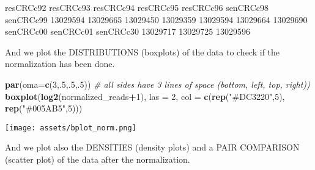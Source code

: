 \documentclass[
]{article}
\newenvironment{Shaded}{\begin{snugshade}}{\end{snugshade}}
\newcommand{\AttributeTok}[1]{\textcolor[rgb]{0.13,0.29,0.53}{#1}}
\newcommand{\CommentTok}[1]{\textcolor[rgb]{0.56,0.35,0.01}{\textit{#1}}}
\newcommand{\DecValTok}[1]{\textcolor[rgb]{0.00,0.00,0.81}{#1}}
\newcommand{\FunctionTok}[1]{\textcolor[rgb]{0.13,0.29,0.53}{\textbf{#1}}}
\newcommand{\NormalTok}[1]{#1}
\newcommand{\SpecialCharTok}[1]{\textcolor[rgb]{0.81,0.36,0.00}{\textbf{#1}}}
\newcommand{\StringTok}[1]{\textcolor[rgb]{0.31,0.60,0.02}{#1}}
\begin{document}
\begin{Shaded}
\begin{Highlighting}[]
\NormalTok{resCRCc92 resCRCc93 resCRCc94 resCRCc95 resCRCc96 senCRCc98 senCRCc99 }
\NormalTok{ 13029594  13029665  13029450  13029359  13029594  13029664  13029690 }
\NormalTok{senCRCc00 senCRCc01 senCRCc30 }
\NormalTok{ 13029717  13029725  13029596 }
\end{Highlighting}
\end{Shaded}

And we plot the DISTRIBUTIONS (boxplots) of the data to check if the
normalization has been done.

\begin{Shaded}
\begin{Highlighting}[]
\FunctionTok{par}\NormalTok{(}\AttributeTok{oma=}\FunctionTok{c}\NormalTok{(}\DecValTok{3}\NormalTok{,.}\DecValTok{5}\NormalTok{,.}\DecValTok{5}\NormalTok{,.}\DecValTok{5}\NormalTok{)) }\CommentTok{\# all sides have 3 lines of space (bottom, left, top, right)) }
\FunctionTok{boxplot}\NormalTok{(}\FunctionTok{log2}\NormalTok{(normalized\_reads}\SpecialCharTok{+}\DecValTok{1}\NormalTok{), }\AttributeTok{las =} \DecValTok{2}\NormalTok{, }\AttributeTok{col =} \FunctionTok{c}\NormalTok{(}\FunctionTok{rep}\NormalTok{(}\StringTok{"\#DC3220"}\NormalTok{,}\DecValTok{5}\NormalTok{), }\FunctionTok{rep}\NormalTok{(}\StringTok{"\#005AB5"}\NormalTok{,}\DecValTok{5}\NormalTok{)))}
\end{Highlighting}
\end{Shaded}

\texttt{[image: assets/bplot\_norm.png]}

And we plot also the DENSITIES (density plots) and a PAIR COMPARISON
(scatter plot) of the data after the normalization.
\end{document}
